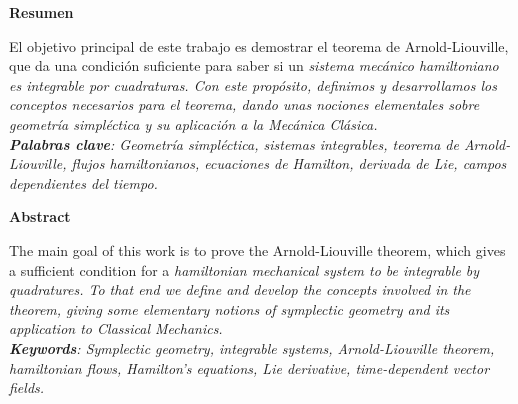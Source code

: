 \thispagestyle{empty}
\vspace*{3cm}
  \begin{center}
    \textbf{Resumen}
  \end{center}

  El objetivo principal de este trabajo es demostrar el teorema de Arnold-Liouville, que da una condición suficiente para saber si un \em sistema mecánico hamiltoniano \em  es \em integrable por cuadraturas\em. Con este propósito, definimos y desarrollamos los conceptos necesarios para el teorema, dando unas nociones elementales sobre \em geometría simpléctica \em  y su aplicación a la Mecánica Clásica.\\
  

  \noindent \textbf{Palabras clave}:\emph{ Geometría simpléctica, sistemas integrables, teorema de Arnold-Liouville, flujos hamiltonianos, ecuaciones de Hamilton, derivada de Lie, campos dependientes del tiempo.}\\


  \begin{center}
    \textbf{Abstract}
  \end{center}

The main goal of this work is to prove the Arnold-Liouville theorem, which gives a sufficient condition for a \em hamiltonian mechanical system \em to be \em integrable by quadratures\em. To that end we define and develop the concepts involved in the theorem, giving some elementary notions of \em symplectic geometry \em and its application to Classical Mechanics.\\

\noindent \textbf{Keywords}:\emph{ Symplectic geometry, integrable systems, Arnold-Liouville theorem, hamiltonian flows, Hamilton's equations, Lie derivative, time-dependent vector fields.}\\
\



